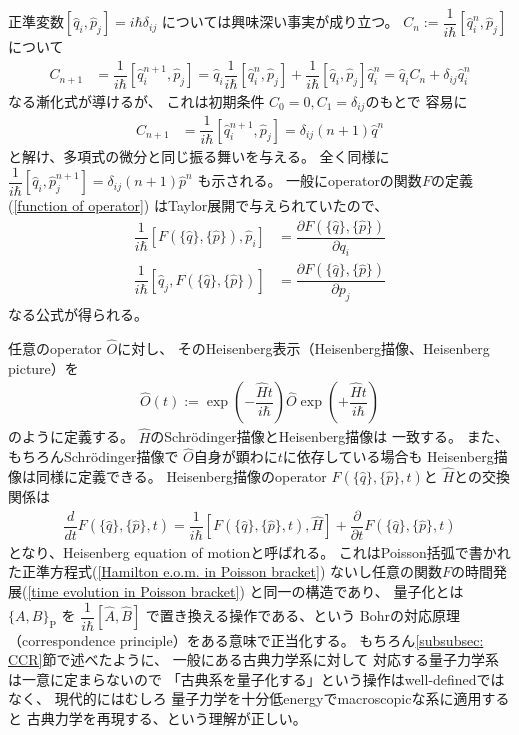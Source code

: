 正準変数$[\hat{q}_i, \hat{p}_j] = i\hbar\delta_{ij}$
については興味深い事実が成り立つ。
$C_n := \dfrac{1}{i\hbar} [\hat{q}^n_i, \hat{p}_j]$について
\begin{align}
    C_{n+1}
    &=
    \dfrac{1}{i\hbar}
    [\hat{q}^{n+1}_i, \hat{p}_j]
    =
    \hat{q}_i 
    \dfrac{1}{i\hbar}
    [\hat{q}_i^n, \hat{p}_j]
    +
    \dfrac{1}{i\hbar}
    [\hat{q}_i, \hat{p}_j] \hat{q}_i^n
    =
    \hat{q}_i C_n
    +
    \delta_{ij} \hat{q}_i^n
\end{align}
なる漸化式が導けるが、
これは初期条件
$C_0  = 0, C_1 = \delta_{ij}$のもとで
容易に
\begin{align}
    C_{n+1} &= 
    \dfrac{1}{i\hbar}
    [\hat{q}^{n+1}_i, \hat{p}_j]
    = \delta_{ij} (n+1) \hat{q}^n
\label{differential by commutator}
\end{align}
と解け、多項式の微分と同じ振る舞いを与える。
全く同様に
$\dfrac{1}{i\hbar}
[\hat{q}_i, \hat{p}^{n+1}_j]
= \delta_{ij} (n+1) \hat{p}^n$
も示される。
一般にoperatorの関数$F$の定義
(\ref{function of operator})
はTaylor展開で与えられていたので、
\begin{align}
    \dfrac{1}{i\hbar}
    [F(\{ \hat{q} \},\{ \hat{p} \}), \hat{p}_i]
    &=
    \dfrac{
        \partial F(\{ \hat{q} \},\{ \hat{p} \})
    }{
        \partial q_i
    }
\\
    \dfrac{1}{i\hbar}
    [\hat{q}_j, F(\{ \hat{q} \},\{ \hat{p} \})]
    &=
    \dfrac{
        \partial F(\{ \hat{q} \},\{ \hat{p} \})
    }{
        \partial p_j
    }
\end{align}
なる公式が得られる。

任意のoperator $\hat{O}$に対し、
そのHeisenberg表示（Heisenberg描像、Heisenberg picture）を
\begin{align}
    \hat{O}(t)
    :=
    \exp\left(
        -\dfrac{\hat{H} t}{i\hbar}
    \right)
        \hat{O}
    \exp\left(
        +\dfrac{\hat{H} t}{i\hbar}
    \right)
\end{align}
のように定義する。
$\hat{H}$のSchr\"odinger描像とHeisenberg描像は
一致する。
また、もちろんSchr\"odinger描像で
$\hat{O}$自身が顕わに$t$に依存している場合も
Heisenberg描像は同様に定義できる。
Heisenberg描像のoperator
$F(\{ \hat{q} \},\{ \hat{p} \}, t)$と
$\hat{H}$との交換関係は
\begin{align}
    \dfrac{d}{d t}
    F(\{ \hat{q} \},\{ \hat{p} \}, t)
    =
    \dfrac{1}{i\hbar}
    [F(\{ \hat{q} \},\{ \hat{p} \}, t), \hat{H}]
    + \dfrac{\partial}{\partial t}
    F(\{ \hat{q} \},\{ \hat{p} \}, t)
    \label{Heisenberg e.o.m}
\end{align}
となり、Heisenberg equation of motionと呼ばれる。
これはPoisson括弧で書かれた正準方程式(\ref{Hamilton e.o.m. in Poisson bracket})
ないし任意の関数$F$の時間発展(\ref{time evolution in Poisson bracket})
と同一の構造であり、
量子化とは
$\{A, B\}_{ \mathrm{P} }$
を
$\dfrac{1}{i\hbar} [\hat{A}, \hat{B}]$
で置き換える操作である、という
Bohrの対応原理（correspondence principle）をある意味で正当化する。
もちろん\ref{subsubsec: CCR}節で述べたように、
一般にある古典力学系に対して
対応する量子力学系は一意に定まらないので
「古典系を量子化する」という操作はwell-definedではなく、
現代的にはむしろ
量子力学を十分低energyでmacroscopicな系に適用すると
古典力学を再現する、という理解が正しい。
